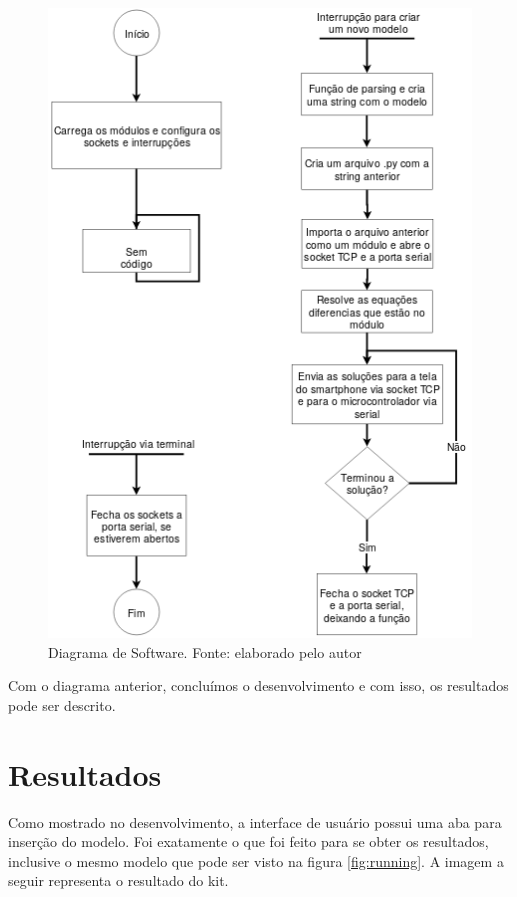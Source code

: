 \documentclass[journal]{IEEEtranTIE}
\begin{document}
\begin{figure}[H]
	\includegraphics[width=\linewidth]{img/software.png}
    \caption{Diagrama de Software. Fonte: elaborado pelo autor}
    \label{fig:real}
\end{figure}

Com o diagrama anterior, concluímos o desenvolvimento e com isso, os resultados pode ser descrito.


\section{Resultados}

Como mostrado no desenvolvimento, a interface de usuário possui uma aba para inserção do modelo. Foi exatamente o que foi feito para se obter os resultados, inclusive o mesmo modelo que pode ser visto na figura \ref{fig:running}. A imagem a seguir representa o resultado do kit.
\end{document}
